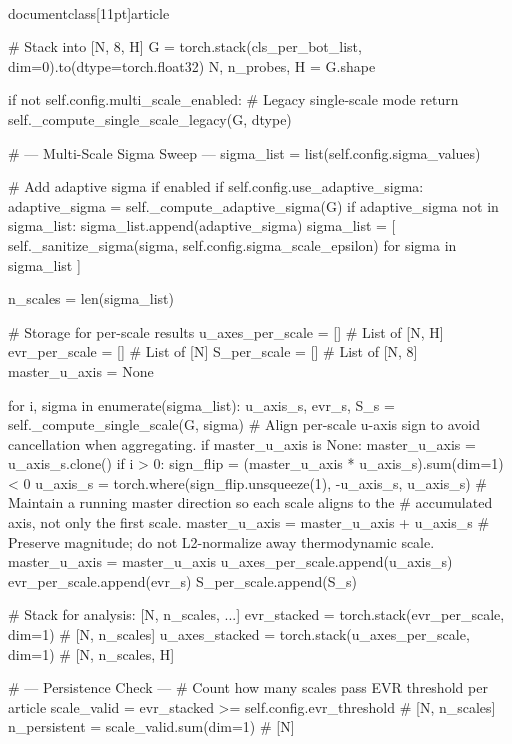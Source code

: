 \\documentclass[11pt]{article}
\begin{document}
\begin{CodeBlock}
        # Stack into [N, 8, H]
        G = torch.stack(cls_per_bot_list, dim=0).to(dtype=torch.float32)
        N, n_probes, H = G.shape

        if not self.config.multi_scale_enabled:
            # Legacy single-scale mode
            return self._compute_single_scale_legacy(G, dtype)

        # --- Multi-Scale Sigma Sweep ---
        sigma_list = list(self.config.sigma_values)

        # Add adaptive sigma if enabled
        if self.config.use_adaptive_sigma:
            adaptive_sigma = self._compute_adaptive_sigma(G)
            if adaptive_sigma not in sigma_list:
                sigma_list.append(adaptive_sigma)
        sigma_list = [
            self._sanitize_sigma(sigma, self.config.sigma_scale_epsilon)
            for sigma in sigma_list
        ]

        n_scales = len(sigma_list)

        # Storage for per-scale results
        u_axes_per_scale = []  # List of [N, H]
        evr_per_scale = []     # List of [N]
        S_per_scale = []       # List of [N, 8]
        master_u_axis = None

        for i, sigma in enumerate(sigma_list):
            u_axis_s, evr_s, S_s = self._compute_single_scale(G, sigma)
            # Align per-scale u-axis sign to avoid cancellation when aggregating.
            if master_u_axis is None:
                master_u_axis = u_axis_s.clone()
            if i > 0:
                sign_flip = (master_u_axis * u_axis_s).sum(dim=1) < 0
                u_axis_s = torch.where(sign_flip.unsqueeze(1), -u_axis_s, u_axis_s)
                # Maintain a running master direction so each scale aligns to the
                # accumulated axis, not only the first scale.
                master_u_axis = master_u_axis + u_axis_s
                # Preserve magnitude; do not L2-normalize away thermodynamic scale.
                master_u_axis = master_u_axis
            u_axes_per_scale.append(u_axis_s)
            evr_per_scale.append(evr_s)
            S_per_scale.append(S_s)

        # Stack for analysis: [N, n_scales, ...]
        evr_stacked = torch.stack(evr_per_scale, dim=1)  # [N, n_scales]
        u_axes_stacked = torch.stack(u_axes_per_scale, dim=1)  # [N, n_scales, H]

        # --- Persistence Check ---
        # Count how many scales pass EVR threshold per article
        scale_valid = evr_stacked >= self.config.evr_threshold  # [N, n_scales]
        n_persistent = scale_valid.sum(dim=1)  # [N]


\end{CodeBlock}
\end{document}
